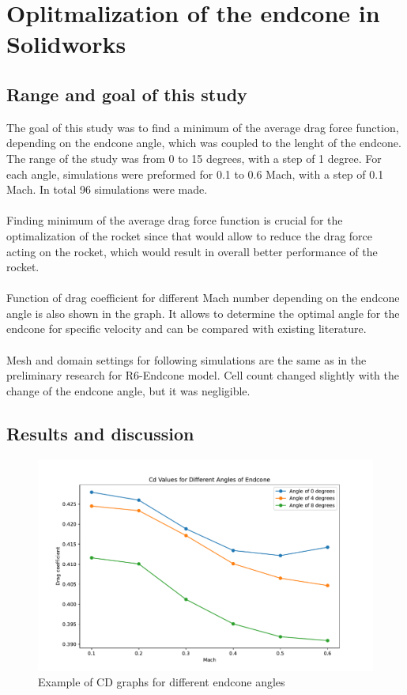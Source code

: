 \documentclass{article}
\begin{document}
\section{Oplitmalization of the endcone in Solidworks}
\subsection{Range and goal of this study}
The goal of this study was to find a minimum of the average drag force function, depending on
the endcone angle, which was coupled to the lenght of the endcone. The range of the
study was from 0 to 15 degrees, with a step of 1 degree. For each angle, simulations were preformed for 
0.1 to 0.6 Mach, with a step of 0.1 Mach. In total 96 simulations were made.\\\\
Finding minimum of the average drag force function is crucial for the optimalization of the rocket
since that would allow to reduce the drag force acting on the rocket, which would result in
overall better performance of the rocket.\\\\
Function of drag coefficient for different Mach number depending on the endcone angle is also 
shown in the graph. It allows to determine the optimal angle for the endcone for specific
velocity and can be compared with existing literature.\\\\
Mesh and domain settings for following simulations are the same as in the preliminary research for
R6-Endcone model. Cell count changed slightly with the change of the endcone angle, but it was
negligible.

\subsection{Results and discussion}

\begin{figure}[H]
    \centering
    \includegraphics[width=\textwidth]{../data/R6-Parametric-Endcone/ExampleCdGraphs.pdf}
    \caption{Example of CD graphs for different endcone angles}
\end{figure}
\end{document}
